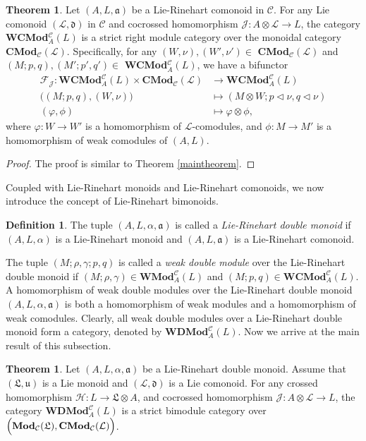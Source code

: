 \documentclass[11pt]{amsart}
\newcommand{\calC}{\mathcal{C}}
\theoremstyle{definition}
\newtheorem{defi}[theo]{Definition}
\newtheorem{theor}[theo]{Theorem}
\numberwithin{equation}{section}
\begin{document}
\begin{theor}\label{rightmodule}
Let $(A,L,\mathfrak{a})$ be a Lie-Rinehart comonoid in $\calC$. For any Lie comonoid $(\mathcal{L}, \mathfrak{d})$ in $\calC$ and cocrossed homomorphism $\mathcal{J}:A\otimes \mathcal{L} \to L$, the category {\bf WCMod}$^{\calC}_A(L)$ is a strict right module category over the monoidal category {\bf CMod}$_{\calC}(\mathcal{L})$. Specifically, for any $(W,\nu), (W',\nu') \in$ {\bf CMod}$_{\calC}(\mathcal{L})$ and $(M;p,q), (M';p',q')\in$ {\bf WCMod}$^{\calC}_A(L)$, we have a bifunctor 
\begin{align*}
				\mathcal{F}_{\mathcal{J}}:   \textbf{WCMod}^{\calC}_A(L) \times \textbf{CMod}_{\calC}(\mathcal{L}) &\to  \textbf{WCMod}^{\calC}_A(L) \\
				\Big( (M;p,q), (W,\nu) \Big) & \mapsto (M\otimes W; p \vartriangleleft \nu, q \vartriangleleft \nu )\\
				(\varphi, \phi) & \mapsto \varphi \otimes \phi,
\end{align*}
where $\varphi: W \to W'$ is a homomorphism of $\mathcal{L}$-comodules, and $\phi:M\to M'$ is a homomorphism of weak comodules of $(A,L)$. 
\end{theor}
\begin{proof}
The proof is similar to Theorem \ref{maintheorem}.
\end{proof}
		
Coupled with Lie-Rinehart monoids and Lie-Rinehart comonoids, we now introduce the concept of Lie-Rinehart bimonoids. 
\begin{defi}
The tuple $(A,L,\alpha,\mathfrak{a})$ is called a  \emph{Lie-Rinehart double monoid} if $(A,L,\alpha)$ is a Lie-Rinehart monoid and $(A,L,\mathfrak{a})$ is a Lie-Rinehart comonoid.
\end{defi}
The tuple $(M;\rho,\gamma;p,q)$ is called a \emph{weak double module} over the Lie-Rinehart double monoid if $(M;\rho,\gamma)\in \textbf{WMod}^{\calC}_A(L)$ and $(M;p,q)\in \textbf{WCMod}^{\calC}_A(L)$.   A homomorphism of weak double modules over the Lie-Rinehart double monoid  $(A,L,\alpha,\mathfrak{a})$ is both a homomorphism of weak modules and a homomorphism of weak comodules. Clearly, all weak double modules over a Lie-Rinehart double monoid form a category, denoted by $\textbf{WDMod}^{\calC}_A(L)$. 
Now we arrive at the main result of this subsection. 
\begin{theor}
Let $(A,L,\alpha,\mathfrak{a})$ be a Lie-Rinehart double monoid. Assume that $(\mathfrak{L},\mathfrak{u})$ is a Lie monoid and $(\mathcal{L},\mathfrak{d})$ is a Lie comonoid. For any crossed homomorphism $\mathcal{H}: L \rightarrow \mathfrak{L}\otimes A$, and cocrossed homomorphism $\mathcal{J}:A\otimes \mathcal{L} \to L$, the category $\textbf{WDMod}^{\calC}_A(L)$ is a strict  bimodule category over  $\Big(\mathrm{ \bf Mod}_{\calC}(\mathfrak{L}), \mathrm{ \bf CMod}_{\calC}(\mathcal{L})\Big)$. 
\end{theor}
		
\end{document}
